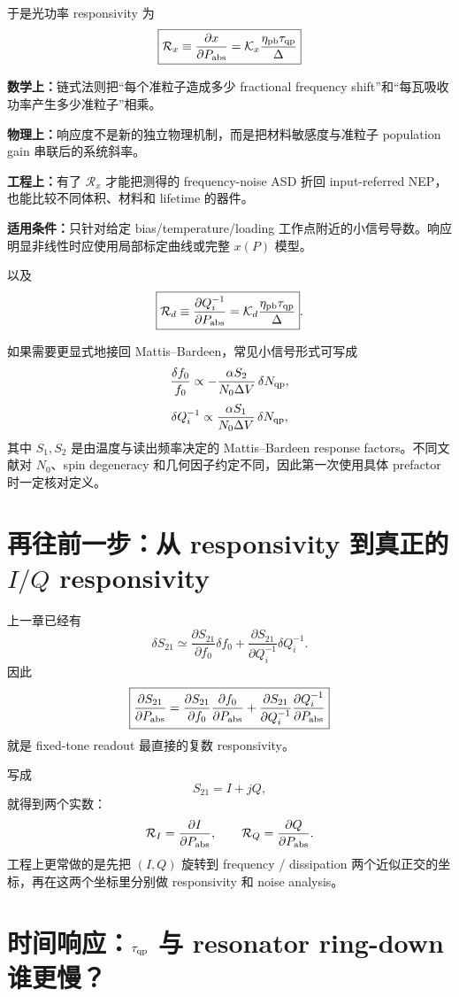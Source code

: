 \documentclass[11pt,a4paper,openany]{ctexrep}
\newcommand{\formulaexplain}[4]{%
\begin{formulaguidebox}
\textbf{\color{KidBlue}数学上：}#1\par
\textbf{\color{KidTeal}物理上：}#2\par
\textbf{\color{KidGold!55!black}工程上：}#3\par
\textbf{\color{KidRed}适用条件：}#4
\end{formulaguidebox}%
}
\begin{document}
于是光功率 responsivity 为
\[
\boxed{
\mathcal R_x
\equiv
\frac{\partial x}{\partial P_{\rm abs}}
=\mathcal K_x
\frac{\eta_{\rm pb}\tau_{\rm qp}}{\Delta}
}
\]
\formulaexplain
{链式法则把“每个准粒子造成多少 fractional frequency shift”和“每瓦吸收功率产生多少准粒子”相乘。}
{响应度不是新的独立物理机制，而是把材料敏感度与准粒子 population gain 串联后的系统斜率。}
{有了 $\mathcal R_x$ 才能把测得的 frequency-noise ASD 折回 input-referred NEP，也能比较不同体积、材料和 lifetime 的器件。}
{只针对给定 bias/temperature/loading 工作点附近的小信号导数。响应明显非线性时应使用局部标定曲线或完整 $x(P)$ 模型。}
以及
\[
\boxed{
\mathcal R_d
\equiv
\frac{\partial Q_i^{-1}}{\partial P_{\rm abs}}
=\mathcal K_d
\frac{\eta_{\rm pb}\tau_{\rm qp}}{\Delta}
}.
\]

如果需要更显式地接回 Mattis--Bardeen，常见小信号形式可写成
\[
\frac{\delta f_0}{f_0}
\propto
-\frac{\alpha S_2}{N_0\Delta V}\,\delta N_{\rm qp},
\]
\[
\delta Q_i^{-1}
\propto
\frac{\alpha S_1}{N_0\Delta V}\,\delta N_{\rm qp},
\]
其中 $S_1,S_2$ 是由温度与读出频率决定的 Mattis--Bardeen response factors。不同文献对 $N_0$、spin degeneracy 和几何因子约定不同，因此第一次使用具体 prefactor 时一定核对定义。

\section{再往前一步：从 responsivity 到真正的 $I/Q$ responsivity}

上一章已经有
\[
\delta S_{21}
\simeq
\frac{\partial S_{21}}{\partial f_0}\delta f_0
+
\frac{\partial S_{21}}{\partial Q_i^{-1}}\delta Q_i^{-1}.
\]
因此
\[
\boxed{
\frac{\partial S_{21}}{\partial P_{\rm abs}}
=
\frac{\partial S_{21}}{\partial f_0}
\frac{\partial f_0}{\partial P_{\rm abs}}
+
\frac{\partial S_{21}}{\partial Q_i^{-1}}
\frac{\partial Q_i^{-1}}{\partial P_{\rm abs}}
}
\]
就是 fixed-tone readout 最直接的复数 responsivity。

写成
\[
S_{21}=I+jQ,
\]
就得到两个实数：
\[
\mathcal R_I=\frac{\partial I}{\partial P_{\rm abs}},
\qquad
\mathcal R_Q=\frac{\partial Q}{\partial P_{\rm abs}}.
\]
工程上更常做的是先把 $(I,Q)$ 旋转到 frequency / dissipation 两个近似正交的坐标，再在这两个坐标里分别做 responsivity 和 noise analysis。

\section{时间响应：$\tau_{\rm qp}$ 与 resonator ring-down 谁更慢？}
\end{document}
